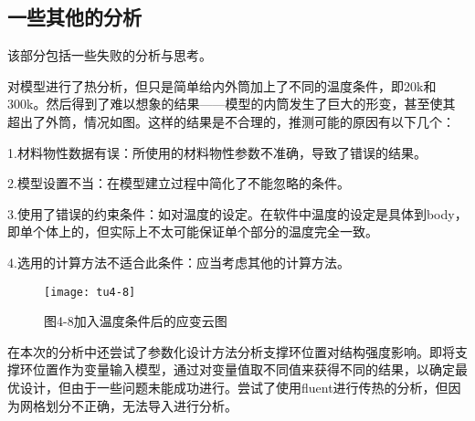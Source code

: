 \documentclass[UTF8,a4paper]{ctexart}
\begin{document}
	\subsection{一些其他的分析}
	该部分包括一些失败的分析与思考。
	
	对模型进行了热分析，但只是简单给内外筒加上了不同的温度条件，即20k和300k。然后得到了难以想象的结果——模型的内筒发生了巨大的形变，甚至使其超出了外筒，情况如图。这样的结果是不合理的，推测可能的原因有以下几个：
	
	1.材料物性数据有误：所使用的材料物性参数不准确，导致了错误的结果。
	
	2.模型设置不当：在模型建立过程中简化了不能忽略的条件。
	
	3.使用了错误的约束条件：如对温度的设定。在软件中温度的设定是具体到body，即单个体上的，但实际上不太可能保证单个部分的温度完全一致。
	
	4.选用的计算方法不适合此条件：应当考虑其他的计算方法。
	\begin{figure}[H]
		\centering
		\texttt{[image: tu4-8]}
		\caption*{图4-8加入温度条件后的应变云图}
		\label{fig:tu4-8}
	\end{figure}
	在本次的分析中还尝试了参数化设计方法分析支撑环位置对结构强度影响。即将支撑环位置作为变量输入模型，通过对变量值取不同值来获得不同的结果，以确定最优设计，但由于一些问题未能成功进行。尝试了使用fluent进行传热的分析，但因为网格划分不正确，无法导入进行分析。
	
\end{document}
